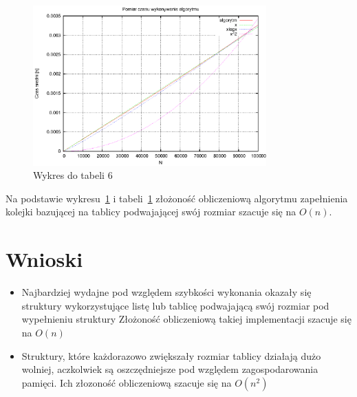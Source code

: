 \documentclass[a4paper,11pt]{article}
\begin{document}
\begin{enumerate}
\begin{table}[th]
\begin{tabular}{|l|l|l|}
\hline
    \end{tabular}
    \label{tab6}
    \end{table}
    \newpage
\begin{figure}[th]
\centering
\includegraphics[width=0.8\textwidth]{wykres6.eps}
\caption{Wykres do tabeli 6}
\label{Wykres6}
\end{figure} 
Na podstawie wykresu~\ref{Wykres6} i tabeli~\ref{tab6} złożoność obliczeniową algorytmu zapełnienia kolejki bazującej na tablicy podwajającej swój rozmiar szacuje się na $ O(n) $.
\end{enumerate}

\section{Wnioski}

\begin{itemize}
\item Najbardziej wydajne pod względem szybkości wykonania okazały się struktury wykorzystujące listę lub tablicę podwajającą swój rozmiar pod wypełnieniu struktury
Złożoność obliczeniową takiej implementacji szacuje się na $ O(n) $
\item Struktury, które każdorazowo zwiększały rozmiar tablicy działają dużo wolniej, aczkolwiek są oszczędniejsze pod względem zagospodarowania pamięci.
Ich złozoność obliczeniową szacuje się na $ O(n^{2}) $
\end{itemize}
\end{document}
